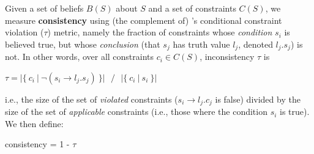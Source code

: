 \documentclass[11pt]{article}
\newenvironment{myquote2}{                   %
  \parskip 1mm \begin{quoting}[vskip=0mm,leftmargin=4mm]}{
\end{quoting}}
\begin{document}
Given a set of beliefs $B(S)$ about $S$ and a set of constraints $C(S)$, we measure
{\bf consistency} using (the complement of) \citet{Li2019ALF}'s conditional 
constraint violation ($\tau$) metric,
namely the fraction of constraints whose {\it condition} $s_i$ is believed true,
but whose {\it conclusion} (that $s_j$ has truth value $l_j$, denoted $l_j.s_j$) is not. 
In other words, over all constraints $c_i \in C(S)$, inconsistency $\tau$ is
\begin{myquote2}
$\tau = | \{ ~c_i~ |~ \neg (s_i \rightarrow l_j.s_j)~ \} | ~~~ / ~~~ | \{~ c_i ~|~ s_i ~\} |$ 
\vspace{1mm}
\end{myquote2} 
i.e., the size of the set of {\it violated} constraints ($s_i \rightarrow l_j.c_j$ is false)
divided by the size of the set of {\it applicable} constraints (i.e., those where the condition $s_i$ is true). We then define:
\begin{myquote2}
\begin{center}
consistency = 1 - $\tau$
\end{center}
\end{myquote2}
\end{document}
